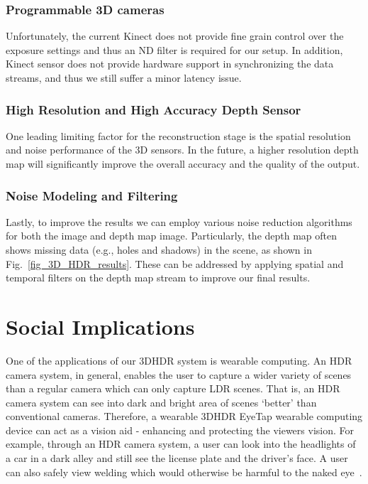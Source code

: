 \subsubsection{Programmable 3D cameras}
Unfortunately, the current Kinect does not provide fine grain control over the exposure settings and thus an ND filter is required for our setup. In addition, Kinect sensor does not provide hardware support in synchronizing the data streams, and thus we still suffer a minor latency issue. 

\subsubsection{High Resolution and High Accuracy Depth Sensor}
One leading limiting factor for the reconstruction stage is the spatial resolution and noise performance of the 3D sensors. In the future, a higher resolution depth map will significantly improve the overall accuracy and the quality of the output.

\subsubsection{Noise Modeling and Filtering}
Lastly, to improve the results we can employ various noise reduction algorithms for both the image and depth map image. Particularly, the depth map often shows missing data (e.g., holes and shadows) in the scene, as shown in Fig.~\ref{fig_3D_HDR_results}. These can be addressed by applying spatial and temporal filters \cite{matyunin2011temporal} on the depth map stream to improve our final results.

\section{Social Implications}
One of the applications of our 3DHDR system is wearable computing.
An HDR camera system, in general, enables the user to capture a wider variety
of scenes than a regular camera which can only capture LDR scenes. That is,
an HDR camera system can see into dark and bright area of scenes `better' than
conventional cameras. Therefore, a wearable 3DHDR EyeTap wearable computing
device can act as a vision aid - enhancing and protecting the viewers vision.
For example, through an HDR camera system, a user can look into the headlights
of a car in a dark alley and still see the license plate and the driver's face.
A user can also safely view welding
which would otherwise be harmful to the naked eye~\cite{mann2012hdrchitecture}.%


